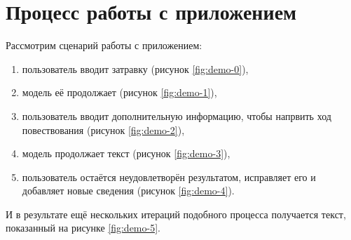 \section{Процесс работы с приложением}

Рассмотрим сценарий работы с приложением:
\begin{enumerate}
    \item пользователь вводит затравку (рисунок \ref*{fig:demo-0}),
    \item модель её продолжает (рисунок \ref*{fig:demo-1}),
    \item пользователь вводит дополнительную информацию, чтобы напрвить ход повествования (рисунок \ref*{fig:demo-2}),
    \item модель продолжает текст (рисунок \ref*{fig:demo-3}),
    \item пользователь остаётся неудовлетворён результатом, исправляет его и добавляет новые сведения (рисунок \ref*{fig:demo-4}).
\end{enumerate}

И в результате ещё нескольких итераций подобного процесса получается текст, показанный на рисунке \ref*{fig:demo-5}.

